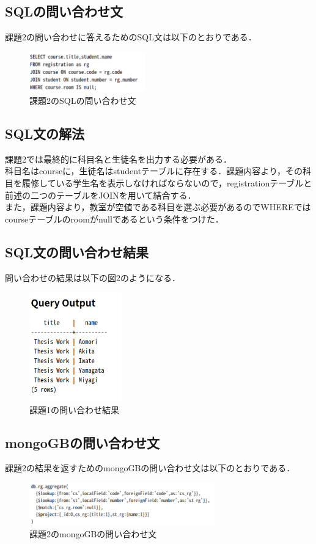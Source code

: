 \documentclass[dvipdfmx]{jarticle}
\begin{document}
\subsection{SQLの問い合わせ文}
課題2の問い合わせに答えるためのSQL文は以下のとおりである．
\begin{figure}[h]
    \centering
    \includegraphics[width=5cm]{sql2.png}
    \caption{課題2のSQLの問い合わせ文}
\end{figure}
\subsection{SQL文の解法}
課題2では最終的に科目名と生徒名を出力する必要がある．\\
科目名はcourseに，生徒名はstudentテーブルに存在する．課題内容より，その科目を履修している学生名を表示しなければならないので，registrationテーブルと
前述の二つのテーブルをJOINを用いて結合する．\\
また，課題内容より，教室が空値である科目を選ぶ必要があるのでWHEREではcourseテーブルのroomがnullであるという条件をつけた．
\clearpage
\subsection{SQL文の問い合わせ結果}
問い合わせの結果は以下の図2のようになる．\\
\begin{figure}[h]
    \centering
    \includegraphics[width=4cm]{sqlresult2.png}
    \caption{課題1の問い合わせ結果}
\end{figure}
\subsection{mongoGBの問い合わせ文}
課題2の結果を返すためのmongoGBの問い合わせ文は以下のとおりである．\\
\begin{figure}[h]
    \centering
    \includegraphics[width=8cm]{mongo2_code.png}
    \caption{課題2のmongoGBの問い合わせ文}
\end{figure}
\end{document}
